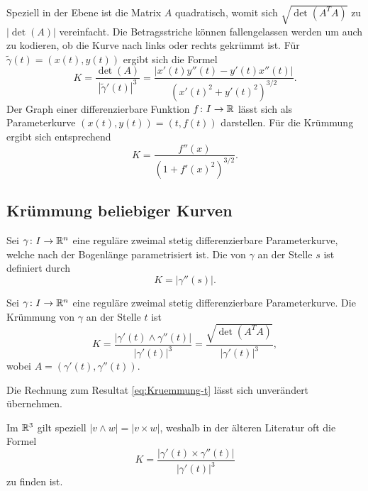 Speziell in der Ebene ist die
Matrix $A$ quadratisch, womit sich $\sqrt{\det(A^T A)}$
zu $|\det(A)|$ vereinfacht. Die Betragsstriche können fallengelassen
werden um auch zu kodieren, ob die Kurve nach links oder rechts
gekrümmt ist. Für $\tilde\gamma(t)=(x(t),y(t))$ ergibt
sich die Formel%
\begin{equation}
K = \frac{\det(A)}{|\tilde\gamma'(t)|^3}
= \frac{|x'(t)y''(t)-y'(t)x''(t)|}{(x'(t)^2+y'(t)^2)^{3/2}}.
\end{equation}
Der Graph einer differenzierbare Funktion $f\colon I\to \mathbb R$ lässt sich
als Parameterkurve $(x(t),y(t))=(t,f(t))$ darstellen. Für die
Krümmung ergibt sich entsprechend
\begin{equation}
K = \frac{f''(x)}{(1+f'(x)^2)^{3/2}}.
\end{equation}

\subsection{Krümmung beliebiger Kurven}

\begin{definition}
Sei $\gamma\colon I\to \mathbb R^n$ eine reguläre zweimal stetig
differenzierbare Parameterkurve, welche nach der Bogenlänge
parametrisiert ist. Die  von $\gamma$ an der Stelle
$s$ ist definiert durch%
\begin{equation}
K = |\gamma''(s)|.
\end{equation}
\end{definition}

\begin{theorem}
Sei $\gamma\colon I\to\mathbb R^n$ eine reguläre zweimal stetig
differenzierbare Parameterkurve. Die Krümmung von $\gamma$ an der
Stelle $t$ ist%
\begin{equation}
K = \frac{|\gamma'(t)\wedge\gamma''(t)|}{|\gamma'(t)|^3}
= \frac{\sqrt{\det(A^T A)}}{|\gamma'(t)|^3},
\end{equation}
wobei $A=(\gamma'(t),\gamma''(t))$.
\end{theorem}
 Die Rechnung zum Resultat \eqref{eq:Kruemmung-t}
lässt sich unverändert übernehmen.\;\qedsymbol

Im $\mathbb R^3$ gilt speziell $|v\wedge w| = |v\times w|$,
weshalb in der älteren Literatur oft die Formel%
\begin{equation}
K = \frac{|\gamma'(t)\times\gamma''(t)|}{|\gamma'(t)|^3}
\end{equation}
zu finden ist.

